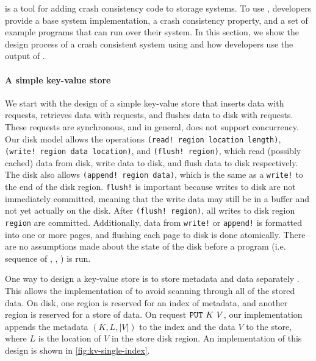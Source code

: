 \fi


\depsynth is a tool for adding crash consistency code to storage systems.
To use \depsynth, developers provide a base system implementation, a crash
consistency property, and a set of example programs that can run over their system.
In this section, we show the design process of a crash consistent system using
\depsynth and how developers use the output of \depsynth.

\paragraph{A simple key-value store}
We start with the design of a simple key-value store that inserts data with \putreq requests,
retrieves data with \get requests, and flushes data to disk with \flush requests.
These requests are synchronous, and in general, \depsynth does not support concurrency.
Our disk model allows the operations \texttt{(read! region location length)},
\texttt{(write! region data location)}, and \texttt{(flush! region)}, which read (possibly cached)
data from disk, write data to disk, and flush data to disk respectively. The disk also allows \texttt{(append! region data)},
which is the same as a \texttt{write!} to the end of the disk region. \texttt{flush!} is important because
writes to disk are not immediately committed, meaning that the write data may still be in a buffer and not
yet actually on the disk. After \texttt{(flush! region)}, all writes to disk region \texttt{region} are committed.
Additionally, data from \texttt{write!} or \texttt{append!} is formatted into one or more pages, and flushing
each page to disk is done atomically. There are no assumptions made about the state of the disk before
a program (i.e. sequence of \putreq, \get, \flush) is run.

One way to design a key-value store is to store metadata and data separately .
This allows the implementation of \get to avoid scanning through all of the stored data.
On disk, one region is reserved for an index of metadata, and another region is reserved for
a store of data. On request $\texttt{PUT}\ K\ V$, our implementation appends the metadata $(K, L, |V|)$
to the index and the data $V$ to the store, where $L$ is the location of $V$
in the store disk region. An implementation of this design is shown in \autoref{fig:kv-single-index}.

